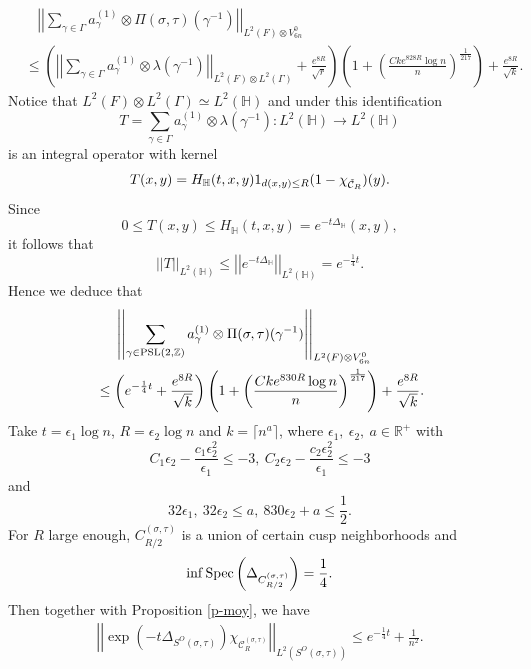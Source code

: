 \documentclass{amsart}
\theoremstyle{plain}
\theoremstyle{definition}
\theoremstyle{remark}
\begin{document}
\begin{align*}
    &\ \ \ \ \left|\left|\sum\limits_{\gamma\in\Gamma}a_\gamma^{(1)}\otimes\Pi(\sigma,\tau)(\gamma^{-1})\right|\right|_{L^2(F)\otimes V_{6n}^0}\\
    &\leq \left(\left|\left|\sum\limits_{\gamma\in\Gamma}a_\gamma^{(1)}\otimes\lambda(\gamma^{-1})\right|\right|_{L^2(F)\otimes L^2(\Gamma)}+\frac{e^{8R}}{\sqrt{r}}\right)\left(1+\left(\frac{Cke^{828 R}\log n}{n}\right)^{\frac{1}{217}}\right)+\frac{e^{8R}}{\sqrt{k}}.
\end{align*}
Notice that $L^2(F)\otimes L^2(\Gamma)\simeq L^2(\mathbb{H})$ and under this identification $$T=\sum\limits_{\gamma\in\Gamma}a_\gamma^{(1)}\otimes\lambda(\gamma^{-1}):L^2(\mathbb{H})\to L^2(\mathbb{H})$$ is an integral operator with kernel 
$$T(x,y)=H_{\mathbb{H}}(t,x,y)1_{d(x,y)\leq R}(1-\chi_{\Tilde{\mathcal{C}}_R})(y).$$
Since
$$0\leq T(x,y)\leq H_{\mathbb{H}}(t,x,y)=e^{-t\Delta_{\mathbb{H}}}(x,y),$$
it follows that 
$$\left|\left|T\right|\right|_{L^2(\mathbb{H})}\leq \left|\left|e^{-t\Delta_{\mathbb{H}}}\right|\right|_{L^2(\mathbb{H})}=e^{-\frac{1}{4}t}.$$
Hence we deduce that
\begin{equation}
\begin{aligned}\label{e-com-2}
   &\ \ \ \ \left|\left|\sum\limits_{\gamma\in\textnormal{PSL}(2,\mathbb{Z})}a_\gamma^{(1)}\otimes\Pi(\sigma,\tau)(\gamma^{-1})\right|\right|_{L^2(F)\otimes V_{6n}^0}\\
    &\leq \left(e^{-\frac{1}{4}t}+\frac{e^{8R}}{\sqrt{k}}\right)\left(1+\left(\frac{Cke^{830 R}\log n}{n}\right)^{\frac{1}{217}}\right)+\frac{e^{8R}}{\sqrt{k}}.
\end{aligned}
\end{equation}
Take $t=\epsilon_1\log n$, $R=\epsilon_2\log n$ and $k=\lceil n^a\rceil$, where $\epsilon_1,\ \epsilon_2,\ a\in\mathbb{R}^+$ with
 $$C_1\epsilon_2-\frac{c_1\epsilon_2^2}{\epsilon_1}\leq -3,\ C_2\epsilon_2-\frac{c_2\epsilon_2^2}{\epsilon_1}\leq -3$$
 and 
 $$32\epsilon_1,\ 32\epsilon_2\leq a,\ 830\epsilon_2+a\leq\frac{1}{2}.$$
 For $R$ large enough, $C_{R/2}^{(\sigma,\tau)}$ is a union of certain cusp neighborhoods and
 $$\inf\textnormal{Spec}\left(\Delta_{C_{R/2}^{(\sigma,\tau)}}\right)=\frac{1}{4}.$$
 Then together with Proposition \ref{p-moy}, we have
 \begin{equation}
     \begin{aligned}\label{e-norm-1}
         \left|\left|\exp(-t\Delta_{S^O(\sigma,\tau)})\chi_{\mathcal{C}_R^{(\sigma,\tau)}}\right|\right|_{L^2(S^O(\sigma,\tau))}\leq e^{-\frac{1}{4}t}+\frac{1}{n^2}.
     \end{aligned}
 \end{equation}
\end{document}
